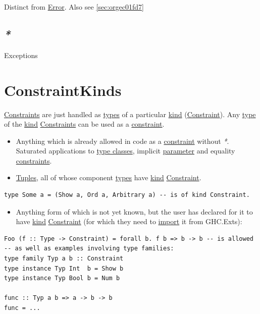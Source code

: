 \documentclass[a4paper,14pt,oneside]{book}
\begin{document}
Distinct from \hyperref[orgbd3bda1]{Error}. Also see \ref{sec:orgec01fd7}

\section{\emph{*}}
\label{sec:org18ddd29}

\label{org59fa78d}Exceptions

\chapter{\label{org57e0173}ConstraintKinds}
\label{sec:org8514970}
\hyperref[org2a5591e]{Constraints} are just handled as \hyperref[org737ac49]{types} of a particular \hyperref[org2edbbb0]{kind} (\hyperref[org58ec6e6]{Constraint}).
Any \hyperref[org6743858]{type} of the \hyperref[org2edbbb0]{kind} \hyperref[org2a5591e]{Constraints} can be used as a \hyperref[org58ec6e6]{constraint}.
\begin{itemize}
\item Anything which is already allowed in code as a \hyperref[org58ec6e6]{constraint} without \emph{*}. Saturated applications to \hyperref[orgef10229]{type classes}, implicit \hyperref[orgabaff9f]{parameter} and equality \hyperref[org2a5591e]{constraints}.
\item \hyperref[org986d5b2]{Tuples}, all of whose component \hyperref[org737ac49]{types} have \hyperref[org2edbbb0]{kind} \hyperref[org58ec6e6]{Constraint}.
\end{itemize}
\begin{verbatim}
type Some a = (Show a, Ord a, Arbitrary a) -- is of kind Constraint.
\end{verbatim}
\begin{itemize}
\item Anything form of which is not yet known, but the user has declared for it to have \hyperref[org2edbbb0]{kind} \hyperref[org58ec6e6]{Constraint} (for which they need to \hyperref[orgbe3fbb1]{import} it from GHC.Exts):
\end{itemize}
\begin{verbatim}
Foo (f :: Type -> Constraint) = forall b. f b => b -> b -- is allowed
-- as well as examples involving type families:
type family Typ a b :: Constraint
type instance Typ Int  b = Show b
type instance Typ Bool b = Num b

func :: Typ a b => a -> b -> b
func = ...
\end{verbatim}
\end{document}
